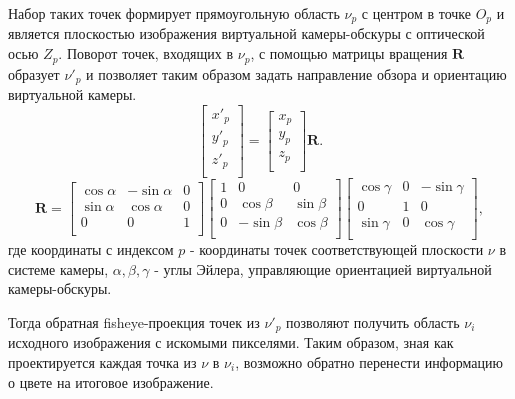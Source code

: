 Набор таких точек формирует прямоугольную область $\nu_p$ с центром в точке $O_p$ и является плоскостью изображения
 виртуальной камеры-обскуры  с оптической осью $Z_p$. Поворот точек, входящих в $\nu_p$, с помощью матрицы вращения 
 $\bm{R}$ образует $\nu'_p$ и позволяет таким образом задать направление обзора и ориентацию виртуальной камеры. 
\begin{equation}
    \label{eq:sweeped}
    \left[\begin{matrix}x'_p\\y'_p\\z'_p\\\end{matrix}\right] = \left[\begin{matrix}x_p\\y_p\\z_p\\\end{matrix}\right] \bm{R}.
\end{equation}  
\begin{equation}
    \label{eq:R}
    \bm{R} = \left[\begin{matrix}\cos{\alpha}&-\sin{\alpha}&0\\\sin{\alpha}&\cos{\alpha}&0\\0&0&1\\\end{matrix}\right]\left[\begin{matrix}1&0&0\\0&\cos{\beta}&\sin{\beta}\\0&-\sin{\beta}&\cos{\beta}\\\end{matrix}\right]\left[\begin{matrix}\cos{\gamma}&0&-\sin{\gamma}\\0&1&0\\\sin{\gamma}&0&\cos{\gamma}\\\end{matrix}\right],
\end{equation} 
где координаты с индексом $p$ -  координаты точек соответствующей плоскости $\nu$ в системе камеры, $\alpha, \beta, \gamma$ - углы Эйлера, управляющие  ориентацией виртуальной камеры-обскуры. %

Тогда обратная fisheye-проекция точек из $\nu'_p$ позволяют получить область $\nu_i$ исходного изображения с искомыми пикселями. 
Таким образом, зная как  проектируется каждая точка из $\nu$ в $\nu_i$, возможно  обратно перенести информацию о цвете на итоговое изображение.  

